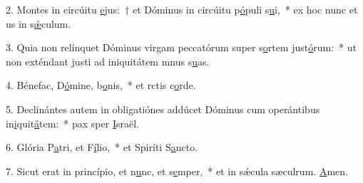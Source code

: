 2. Montes in circúitu \uline{e}jus:~† et Dóminus in circúitu p\uline{ó}puli s\uline{u}i,~* ex hoc nunc et us in s\uline{ǽ}culum.\par 
3. Quia non relínquet Dóminus virgam peccatórum super s\uline{o}rtem just\uline{ó}rum:~* ut non exténdant justi ad iniquitátem mnus s\uline{u}as.\par 
4. Bénefac, D\uline{ó}mine, b\uline{o}nis,~* et rctis c\uline{o}rde.\par 
5. Declinántes autem in obligatiónes addúcet Dóminus cum operántibus in\uline{i}quit\uline{á}tem:~* pax sper \uline{I}sraël.\par 
6. Glória P\uline{a}tri, et F\uline{í}lio,~* et Spiríti S\uline{a}ncto.\par 
7. Sicut erat in princípio, et n\uline{u}nc, et s\uline{e}mper,~* et in sǽcula sæculrum. \uline{A}men.\par 
